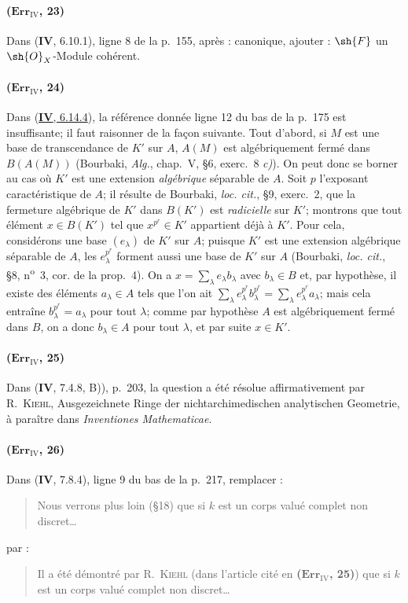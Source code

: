 \paragraph{($\mathbf{Err}_{\mathrm{IV}}$, 23)}
Dans (\textbf{IV}, 6.10.1), ligne 8 de la p.~155, après : canonique, ajouter :
$\sh{F}$ un $\sh{O}_X$-Module cohérent.

\paragraph{($\mathbf{Err}_{\mathrm{IV}}$, 24)}
Dans ({\hyperref[canon-index.ega4.c04.prop.6-14-4]{\textbf{IV}, 6.14.4}}), la référence
donnée ligne 12 du bas de la p.~175 est insuffisante; il faut raisonner
de la façon suivante. Tout d'abord, si $M$ est une base de transcendance
de $K'$ sur $A$, $A(M)$ est algébriquement fermé dans $B(A(M))$
(Bourbaki, \emph{Alg.}, chap.~V, \S6, exerc.~8 \emph{c)}). On peut donc se
borner au cas où $K'$ est une extension \emph{algébrique} séparable de $A$.
Soit $p$ l'exposant caractéristique de $A$; il résulte de Bourbaki,
\emph{loc. cit.}, \S9, exerc.~2, que la fermeture algébrique de $K'$
dans $B(K')$ est \emph{radicielle} sur $K'$; montrons que tout élément
$x\in B(K')$ tel que $x^{p^r}\in K'$ appartient déjà à $K'$. Pour cela,
considérons une base $(e_\lambda)$ de $K'$ sur $A$; puisque $K'$ est une
extension algébrique séparable de $A$, les $e_\lambda^{p^r}$ forment
aussi une base de $K'$ sur $A$ (Bourbaki, \emph{loc. cit.}, \S8,
n\textsuperscript{o}~3, cor. de la prop.~4). On a
$x=\sum_\lambda e_\lambda b_\lambda$ avec $b_\lambda\in B$ et, par
hypothèse, il existe des éléments $a_\lambda\in A$ tels que l'on ait $\sum_\lambda e_\lambda^{p^r}b_\lambda^{p^r}=\sum_\lambda e_\lambda^{p^r}a_\lambda$;
mais cela entraîne $b_\lambda^{p^r}=a_\lambda$ pour tout $\lambda$;
comme par hypothèse $A$ est algébriquement fermé dans $B$, on a donc
$b_\lambda\in A$ pour tout $\lambda$, et par suite $x\in K'$.

\paragraph{($\mathbf{Err}_{\mathrm{IV}}$, 25)}
Dans (\textbf{IV}, 7.4.8, B)), p.~203, la question a été résolue affirmativement
par R.~\textsc{Kiehl}, Ausgezeichnete Ringe der nichtarchimedischen
analytischen Geometrie, à paraître dans \emph{Inventiones
Mathematicae}.

\paragraph{($\mathbf{Err}_{\mathrm{IV}}$, 26)}
Dans (\textbf{IV}, 7.8.4), ligne 9 du bas de la p.~217, remplacer :
\begin{quote}
Nous verrons plus loin (\S18) que si $k$ est un corps valué complet non
discret\ldots
\end{quote}
par :
\begin{quote}
Il a été démontré par R.~\textsc{Kiehl} (dans l'article cité en
\textbf{($\mathbf{Err}_{\mathrm{IV}}$, 25)}) que si $k$ est un corps valué complet non
discret\ldots
\end{quote}


